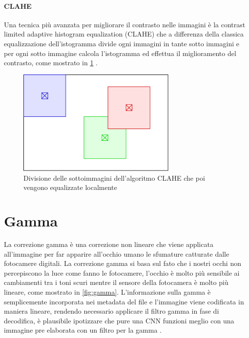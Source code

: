 \paragraph{CLAHE}\label{clahe}

Una tecnica più avanzata per migliorare il contrasto nelle immagini è la contrast limited adaptive histogram equalization (CLAHE) che a differenza della classica equalizzazione dell'istogramma divide ogni immagini in tante sotto immagini e per ogni sotto immagine calcola l'istogramma ed effettua il miglioramento del contrasto, come mostrato in \cref{fig:clahe} \cite{hummel_histogram}.


\begin{figure}[ht]
    \centering
    \includegraphics[width=0.7\textwidth]{preprocessing/clahe.pdf}
    \caption{Divisione delle sottoimmagini dell'algoritmo CLAHE che poi vengono equalizzate localmente}
    \label{fig:clahe}
\end{figure}

\section{Gamma}\label{gamma}

La correzione gamma è una correzione non lineare che viene applicata all'immagine per far apparire all'occhio umano le sfumature catturate dalle fotocamere digitali. La correzione gamma si basa sul fato che i nostri occhi non percepiscono la luce come fanno le fotocamere, l'occhio è molto più sensibile ai cambiamenti tra i toni scuri mentre il sensore della fotocamera è molto più lineare, come mostrato in \cref{fig:gamma}. L'informazione sulla gamma è semplicemente incorporata nei metadata del file e l'immagine viene codificata in maniera lineare, rendendo necessario applicare il filtro gamma in fase di decodifica, è plausibile ipotizzare che pure una CNN funzioni meglio con una immagine pre elaborata con un filtro per la gamma \cite{gamma}.

